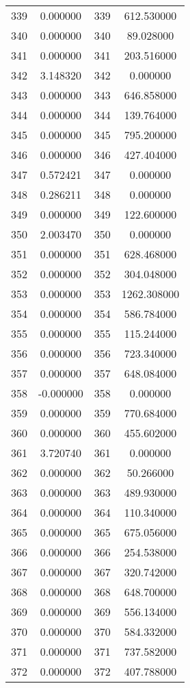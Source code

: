 \documentclass[12pt]{article}
\begin{document}
\begin{longtable}{@{}cccc@{}}
339 & 0.000000 & 339 & 612.530000 \\
340 & 0.000000 & 340 & 89.028000 \\
341 & 0.000000 & 341 & 203.516000 \\
342 & 3.148320 & 342 & 0.000000 \\
343 & 0.000000 & 343 & 646.858000 \\
344 & 0.000000 & 344 & 139.764000 \\
345 & 0.000000 & 345 & 795.200000 \\
346 & 0.000000 & 346 & 427.404000 \\
347 & 0.572421 & 347 & 0.000000 \\
348 & 0.286211 & 348 & 0.000000 \\
349 & 0.000000 & 349 & 122.600000 \\
350 & 2.003470 & 350 & 0.000000 \\
351 & 0.000000 & 351 & 628.468000 \\
352 & 0.000000 & 352 & 304.048000 \\
353 & 0.000000 & 353 & 1262.308000 \\
354 & 0.000000 & 354 & 586.784000 \\
355 & 0.000000 & 355 & 115.244000 \\
356 & 0.000000 & 356 & 723.340000 \\
357 & 0.000000 & 357 & 648.084000 \\
358 & -0.000000 & 358 & 0.000000 \\
359 & 0.000000 & 359 & 770.684000 \\
360 & 0.000000 & 360 & 455.602000 \\
361 & 3.720740 & 361 & 0.000000 \\
362 & 0.000000 & 362 & 50.266000 \\
363 & 0.000000 & 363 & 489.930000 \\
364 & 0.000000 & 364 & 110.340000 \\
365 & 0.000000 & 365 & 675.056000 \\
366 & 0.000000 & 366 & 254.538000 \\
367 & 0.000000 & 367 & 320.742000 \\
368 & 0.000000 & 368 & 648.700000 \\
369 & 0.000000 & 369 & 556.134000 \\
370 & 0.000000 & 370 & 584.332000 \\
371 & 0.000000 & 371 & 737.582000 \\
372 & 0.000000 & 372 & 407.788000 \\

\end{longtable}
\end{document}
